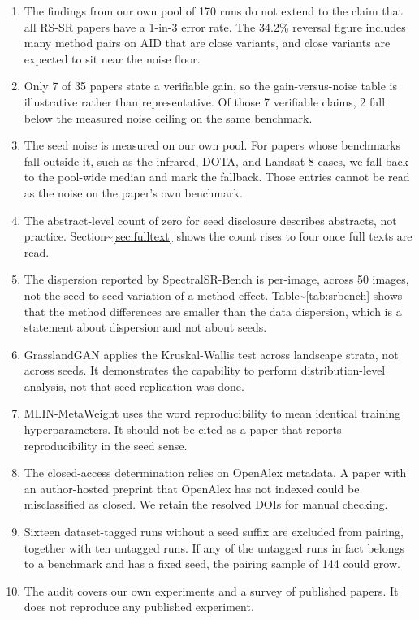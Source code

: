 \documentclass[pdflatex,sn-nature]{sn-jnl}
\begin{document}
\begin{enumerate}
\item The findings from our own pool of 170 runs do not extend to the claim that all RS-SR papers have a 1-in-3 error rate. The 34.2\% reversal figure includes many method pairs on AID that are close variants, and close variants are expected to sit near the noise floor.
\item Only 7 of 35 papers state a verifiable gain, so the gain-versus-noise table is illustrative rather than representative. Of those 7 verifiable claims, 2 fall below the measured noise ceiling on the same benchmark.
\item The seed noise is measured on our own pool. For papers whose benchmarks fall outside it, such as the infrared, DOTA, and Landsat-8 cases, we fall back to the pool-wide median and mark the fallback. Those entries cannot be read as the noise on the paper's own benchmark.
\item The abstract-level count of zero for seed disclosure describes abstracts, not practice. Section\textasciitilde{}\ref{sec:fulltext} shows the count rises to four once full texts are read.
\item The dispersion reported by SpectralSR-Bench is per-image, across 50 images, not the seed-to-seed variation of a method effect. Table\textasciitilde{}\ref{tab:srbench} shows that the method differences are smaller than the data dispersion, which is a statement about dispersion and not about seeds.
\item GrasslandGAN applies the Kruskal-Wallis test across landscape strata, not across seeds. It demonstrates the capability to perform distribution-level analysis, not that seed replication was done.
\item MLIN-MetaWeight uses the word reproducibility to mean identical training hyperparameters. It should not be cited as a paper that reports reproducibility in the seed sense.
\item The closed-access determination relies on OpenAlex metadata. A paper with an author-hosted preprint that OpenAlex has not indexed could be misclassified as closed. We retain the resolved DOIs for manual checking.
\item Sixteen dataset-tagged runs without a seed suffix are excluded from pairing, together with ten untagged runs. If any of the untagged runs in fact belongs to a benchmark and has a fixed seed, the pairing sample of 144 could grow.
\item The audit covers our own experiments and a survey of published papers. It does not reproduce any published experiment.
\end{enumerate}
\end{document}
